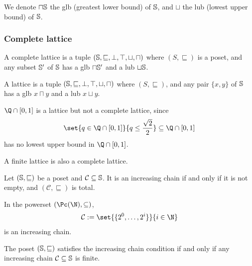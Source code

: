 \documentclass[toc]{../cs-classes/cs-classes}
\begin{document}
\begin{definition}[$\sqcup$, $\sqcap$]
    We denote $\sqcap\S$ the glb (greatest lower bound) of $\S$, and $\sqcup$ the lub (lowest upper bound) of $\S$.
\end{definition}

\subsubsection{Complete lattice}
\begin{definition}
    A complete lattice is a tuple $(\S,\sqsubseteq,\bot,\top, \sqcup, \sqcap)$ where $(S, \sqsubseteq)$ is a poset, and any subset $\S'$ of $\S$ has a glb $\sqcap\S'$ and a lub $\sqcup\S$.
\end{definition}

\begin{definition}[Lattice]
    A lattice is a tuple $(\S,\sqsubseteq,\bot,\top, \sqcup, \sqcap)$ where $(S, \sqsubseteq)$, and any pair $\{x, y\}$ of $\S$ has a glb $x\sqcap y$ and a lub $x\sqcup y$.
\end{definition}
\begin{example}
    $\Q\cap[0, 1]$ is a lattice but not a complete lattice, since 
    \begin{equation*}
        \set{q\in \Q\cap[0, 1]}{q\leq\frac{\sqrt{2}}{2}}\subseteq\Q\cap[0, 1]
    \end{equation*} 
    has no lowest upper bound in $\Q\cap[0, 1]$.
\end{example}
\begin{property}
    A finite lattice is also a complete lattice.
\end{property}

\begin{definition}
    Let $(\S, \sqsubseteq)$ be a poset and $\mathcal{C}\subseteq \S$. It is an increasing chain if and only if it is not empty, and $(\mathcal{C}, \sqsubseteq)$ is total.
\end{definition}

\begin{example}
    In the powerset $(\Pc(\N), \subseteq)$, 
    \begin{equation*}
        \mathcal{C}:=\set{\{2^0, \dots, 2^i\}}{i\in\N}
    \end{equation*}
    is an increasing chain.
\end{example}

\begin{definition}
    The poset $(\S, \sqsubseteq)$ satisfies the increasing chain condition if and only if any increasing chain $\mathcal{C}\subseteq \S$ is finite.
\end{definition}
\end{document}
